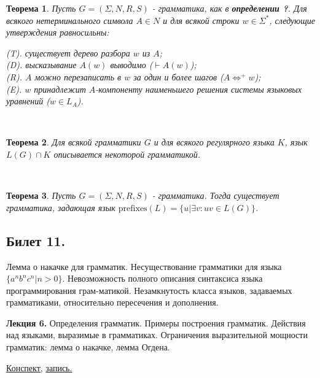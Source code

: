 \documentclass[a4paper]{article}
\newcommand{\mybox}{%
    \collectbox{%
        \setlength{\fboxsep}{1pt}%
        \fbox{\BOXCONTENT}%
    }%
}
\theoremstyle{indented}
\newtheorem{theorem}{Теорема}
\theoremstyle{definition}
\theoremstyle{remark}
\DeclareMathOperator{\Lra}{\Leftrightarrow}
\begin{document}
\begin{theorem}
    Пусть $G = (\Sigma,N,R,S)$ - грамматика, как в \textbf{определении ?}. Для всякого нетерминального символа $A \in N$ и для всякой строки $w \in \Sigma^*$, следующие утверждения равносильны:
        
        (T). существует дерево разбора $w$ из $A$; \\ 

        (D). высказывание $A(w)$ выводимо ($\vdash A(w)$); \\ 

        (R). $A$ можно перезаписать в $w$ за один и более шагов ($A \Lra^+ w$); \\ 

        (E). $w$ принадлежит $A$-компоненту наименьшего решения системы языковых уравнений ($w \in L_A$).
\end{theorem} \ 

\begin{theorem}
    Для всякой грамматики $G$ и для всякого регулярного языка $K$, язык $L(G) \cap K$ описывается некоторой грамматикой.
\end{theorem} \ 

\begin{theorem}
    Пусть $G = (\Sigma, N, R, S)$ - грамматика. Тогда существует грамматика, задающая язык $\text{prefixes}(L) = \{ u | \exists v : uv \in L(G) \}$.
\end{theorem}



\newpage 

\subsection{Билет 11.}

Лемма о накачке для грамматик. Несуществование грамматики для языка $\{a^n b^n c^n | n > 0\}$. Невозможность полного описания синтаксиса языка программирования грам-матикой. Незамкнутость класса языков, задаваемых грамматиками, относительно пересечения и дополнения.

\hrulefill

\textbf{Лекция 6.} Определения грамматик. Примеры построения грамматик. Действия над языками, выразимые в грамматиках. Ограничения выразительной мощности грамматик: лемма о накачке, лемма Огдена.

\begin{flushright}
    \mybox{
        \href{https://users.math-cs.spbu.ru/~okhotin/teaching/tcs_fl_2021/okhotin_tcs_fl_2021_l6.pdf}{Конспект,}
        \href{https://disk.yandex.ru/d/knoQ44wLmGDwwQ/2021-2022%20учебный%20год%20(осенний%20семестр)/2%20курс/Теоретическая%20информатика/M2021-10-06_111624_1h43m_102.mp4}{запись.}
    }
\end{flushright}
\end{document}
